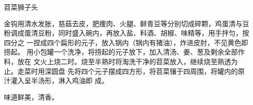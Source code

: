 \begin{recipe}{苕菜狮子头}

\ingredients


\cooking

\step 金钩用清水发胀，慈菇去皮，肥痩肉、火腿、鲜青豆等分别切成碎颗，鸡蛋清与豆
粉调成蛋清豆粉，同时盛入碗内，再放入盐、料酒、胡椒、味精等，用手拌匀，按四分之
一捏成四个扁形的元子，放入锅内（锅内有猪油），炸进皮肘，不见黄色即捞起。
\step 用小包罐一个洗净，将捞起的元子放下，加入清汤、姜、葱及剩余全部作料，放在
文火上烧二时。烧至半熟时将淘洗干净的苕菜放入，继续烧至熟透为止。走菜时用深圆盘
先将四个元子摆成四方形，将苕菜镶于四周围，将罐内的原汁灌入呈半汤形，淋入鸡油即
成。

\notes

味道鲜美，清香。

\end{recipe}

